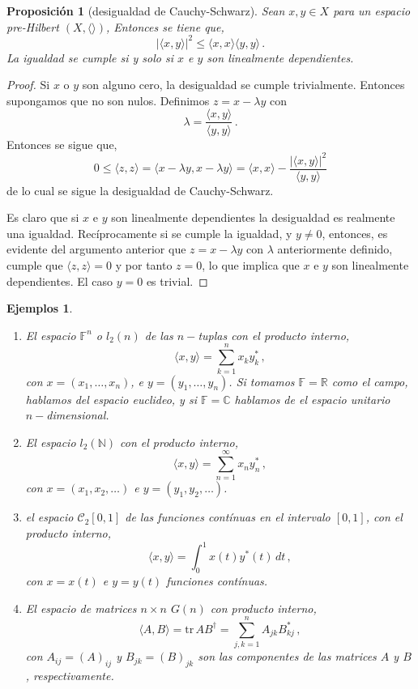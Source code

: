 \documentclass[12pt]{book}
\newtheorem{listaejemplos}{\bf Ejemplos}[chapter]
\newtheorem{prop}{\bf Proposición}[chapter]
\def\beginejems{\begin{listaejemplos}\quad\begin{enumerate}}
\def\endejems{\end{enumerate}\end{listaejemplos}}
\def\NN{\mathbb{N}}
\def\RR{\mathbb{R}}
\def\CC{\mathbb{C}}
\def\FF{\mathbb{F}}
\newcommand{\abs}[1]{\lvert #1\rvert }
\begin{document}
\begin{prop}[desigualdad de Cauchy-Schwarz] Sean $x,y\in X$ para un espacio pre-Hilbert $(X,\langle\rangle)$, Entonces se tiene que,
$$\abs{\langle x, y\rangle}^2\leq \langle x , x\rangle \langle y,y\rangle\,.$$
La igualdad se cumple si y solo si $x$ e $y$  son linealmente dependientes.
\end{prop}
 \begin{proof}

Si $x$ o $y$ son alguno cero, la desigualdad se cumple trivialmente. Entonces supongamos que no son nulos. Definimos $z=x-\lambda y$ con 
$$\lambda=\frac{\langle x,y\rangle}{\langle y,y\rangle}\,.$$
Entonces se sigue  que,
$$0\leq\langle z,z\rangle =\langle x -\lambda y, x-\lambda y\rangle=\langle x,x\rangle - \frac{\abs{\langle x,y\rangle}^2}{\langle y,y\rangle}$$
de lo cual se sigue la desigualdad de Cauchy-Schwarz.

Es claro que si  $x$ e $y$ son linealmente dependientes la desigualdad es realmente una igualdad. Recíprocamente si  se cumple la igualdad, y $y\not=0$, entonces, es evidente del argumento anterior que $z=x-\lambda y$ con $\lambda$   anteriormente definido, cumple que  $\langle z,z\rangle=0$ y por tanto $z=0$, lo  que implica que $x$ e $y$ son linealmente dependientes. El caso $y=0$ es trivial.
\end{proof}


\beginejems
\item El espacio $\FF^n$ o $l_2(n)$ de las $n-$tuplas con el producto interno,
$$\langle x,y\rangle=\sum_{k=1}^n x_k  y_k^*\,,$$
con $x=(x_1,\dots,x_n)$, e $y=(y_1,\dots, y_n)$. Si tomamos $\FF=\RR$ como el campo, hablamos del espacio euclideo, y si $\FF=\CC$ hablamos de el espacio unitario $n-$dimensional.
\item El espacio $l_2(\NN)$ con el producto interno,
$$\langle x,y\rangle =\sum_{ n=1}^\infty x_n y_n^*\,,$$
con $x=(x_1,x_2,\dots)$ e $y=(y_1,y_2,\dots)$.
\item el espacio $\mathcal{C}_2[0,1]$ de las funciones contínuas en el intervalo $[0,1]$, con el producto interno,
$$\langle x, y\rangle=\int_0^1 x(t)y^*(t)\,dt\,,$$
con $x=x(t)$ e $y=y(t)$ funciones contínuas.
\item El espacio de matrices $n\times n$ $G(n)$ con producto interno,
$$\langle A, B\rangle = \mathrm{tr}\, AB^\dag=\sum_{j,k=1}^n  A_{jk} B^*_{kj}\,,$$ 
con $A_{ij}=(A)_{ij}$ y $B_{jk}=(B)_{jk}$ son las componentes de las matrices $A$ y $B$, respectivamente. 
\endejems
\end{document}
